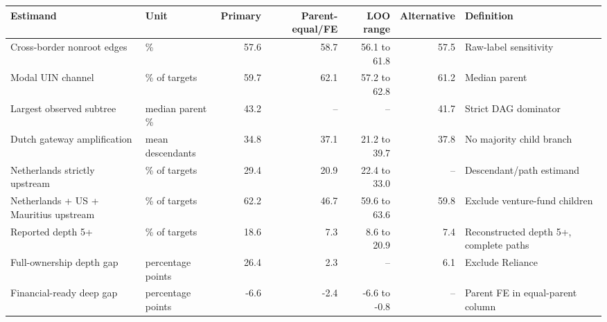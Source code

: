 \begin{tabular}{llrrrrl}
\toprule
Estimand & Unit & Primary & Parent-equal/FE & LOO range & Alternative & Definition \\
\midrule
Cross-border nonroot edges & \% & 57.6 & 58.7 & 56.1 to 61.8 & 57.5 & Raw-label sensitivity \\
Modal UIN channel & \% of targets & 59.7 & 62.1 & 57.2 to 62.8 & 61.2 & Median parent \\
Largest observed subtree & median parent \% & 43.2 & -- & -- & 41.7 & Strict DAG dominator \\
Dutch gateway amplification & mean descendants & 34.8 & 37.1 & 21.2 to 39.7 & 37.8 & No majority child branch \\
Netherlands strictly upstream & \% of targets & 29.4 & 20.9 & 22.4 to 33.0 & -- & Descendant/path estimand \\
Netherlands + US + Mauritius upstream & \% of targets & 62.2 & 46.7 & 59.6 to 63.6 & 59.8 & Exclude venture-fund children \\
Reported depth 5+ & \% of targets & 18.6 & 7.3 & 8.6 to 20.9 & 7.4 & Reconstructed depth 5+, complete paths \\
Full-ownership depth gap & percentage points & 26.4 & 2.3 & -- & 6.1 & Exclude Reliance \\
Financial-ready deep gap & percentage points & -6.6 & -2.4 & -6.6 to -0.8 & -- & Parent FE in equal-parent column \\
\bottomrule
\end{tabular}
